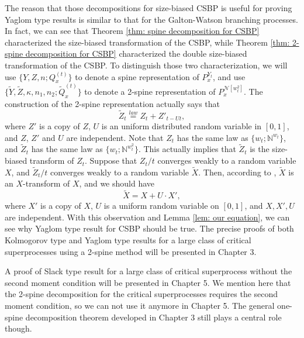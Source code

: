 \documentclass[UTF8]{pkuthss}
\theoremstyle{plain}
\theoremstyle{definition}
\numberwithin{equation}{section}
\begin{document}
	The reason that those decompositions for size-biased CSBP is useful for proving Yaglom type results is similar to that for the Galton-Watson branching processes. 
	In fact, we can see that Theorem \ref{thm: spine decomposition for CSBP} characterized the size-biased transformation of the CSBP, while Theorem \ref{thm: 2-spine decomposition for CSBP} characterized the double size-biased transformation of the CSBP. To distinguish those two characterization, we will use $\{Y, Z, n; Q_x^{(t)}\}$ to denote a spine representation of $P_x^{Y_t}$, and use $\{\tilde Y, \tilde Z, \kappa, n_1, n_2; \tilde Q_x^{(t)}\}$ to denote a 2-spine representation of $P_x^{\mathcal N[w_t^2]}$. 
	The construction of the 2-spine representation actually says that
\[
	\tilde Z_t \overset{law}{=} Z_t + Z'_{t-Ut},
\]
	where $Z'$ is a copy of $Z$, $U$ is an uniform distributed random variable in $[0,1]$, and $Z$, $Z'$ and $U$ are independent.
  	Note that $Z_t$ has the same law as $\{w_t;\mathbb N^{w_t}\}$, and $\tilde Z_t$ has the same law as $\{w_t;\mathbb N^{w^2_t}\}$. This actually implies that $\tilde Z_t$ is the size-biased transform of $Z_t$. 
  	Suppose that $Z_t/t$ converges weakly to a random variable $X$, and $\tilde Z_t/t$ converges weakly to a random variable $\tilde X$.
	Then, according to \cite[Lemma 4.3]{LyonsPemantlePeres1995Conceptual}, $\tilde X$ is an $X$-transform of $X$, and we should have
\[
	\tilde X = X+U\cdot X',
\]
	where $X'$ is a copy of $X$, $U$ is a uniform random variable on $[0,1]$, and $X,X',U$ are independent. 
	With this observation and Lemma \ref{lem: our equation}, we can see why Yaglom type result for CSBP should be true.  
	The precise proofs of both Kolmogorov type and Yaglom type results for a large class of critical superprocesses using a 2-spine method will be presented in Chapter 3.

	A proof of Slack type result for a large class of critical superprocess without the second moment condition will be presented in Chapter 5. We mention here that the 2-spine decomposition for the critical superprocesses requires the second moment condition, so we can not use it anymore in Chapter 5. 
	The general one-spine decomposition theorem developed in Chapter 3 still plays a central role though. 
\end{document}
